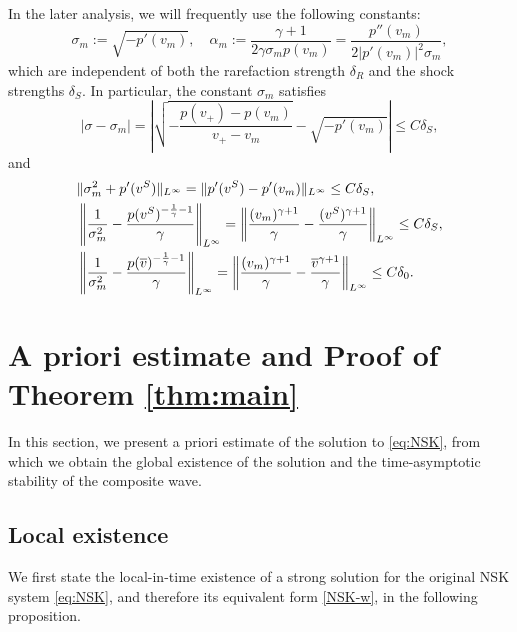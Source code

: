 \documentclass[11pt,reqno]{amsart}
\begin{document}
In the later analysis, we will frequently use the following constants:
\[\sigma_m:=\sqrt{-p'(v_m)}, \quad \alpha_m := \frac{\gamma+1}{2 \gamma \sigma_m p(v_m)}=\frac{p''(v_m)}{2|p'(v_m)|^2 \sigma_m},\]
which are independent of both the rarefaction strength $\delta_R$ and the shock strengths $\delta_S$. In particular, the constant $\sigma_m$ satisfies
\begin{equation}\label{shock_speed_est}
	|\sigma -\sigma_m|=\left|\sqrt{-\frac{p(v_+)-p(v_m)}{v_+-v_m}}-\sqrt{-p'(v_m)}\right| \le C \delta_S,
\end{equation}
and
\begin{align}
	\begin{aligned}\label{shock_speed_est-2}
		&\|\sigma_m^2+p'(v^S)\|_{L^\infty}=\|p'(v^S)-p'(v_m)\|_{L^\infty} \le C \delta_S, \\
		&\left\| \frac{1}{\sigma_m^2}-\frac{p(v^S)^{-\frac{1}{\gamma}-1}}{\gamma} \right\|_{L^\infty}=\left\|\frac{(v_m)^{\gamma+1}}{\gamma }-\frac{(v^S)^{\gamma+1}}{\gamma}\right\|_{L^\infty} \le C \delta_S,\\
		&\left\| \frac{1}{\sigma_m^2}-\frac{p(\overline{v})^{-\frac{1}{\gamma}-1}}{\gamma} \right\|_{L^\infty}=\left\|\frac{(v_m)^{\gamma+1}}{\gamma }-\frac{\overline{v}^{\gamma+1}}{\gamma}\right\|_{L^\infty} \le C \delta_0.
	\end{aligned}
\end{align} 

\section{A priori estimate and Proof of Theorem \ref{thm:main}}\label{sec:apriori}\setcounter{equation}{0}

In this section, we present a priori estimate of the solution to \eqref{eq:NSK}, from which we obtain the global existence of the solution and the time-asymptotic stability of the composite wave.
	
\subsection{Local existence}
We first state the local-in-time existence of a strong solution for the original NSK system \eqref{eq:NSK}, and therefore its equivalent form \eqref{NSK-w}, in the following proposition.
	
\end{document}
